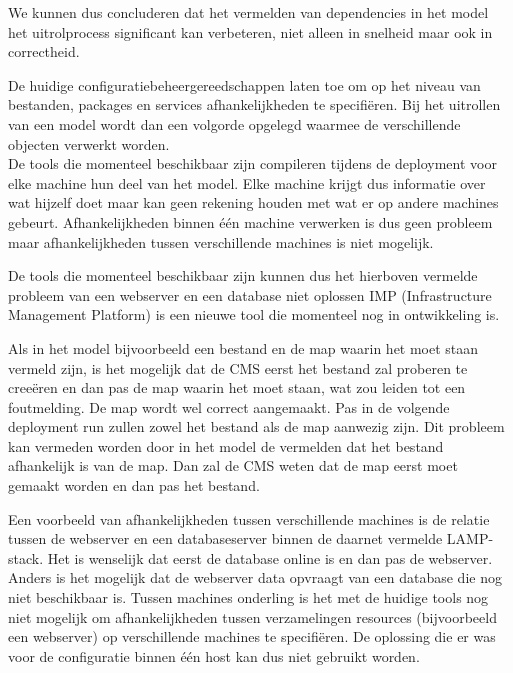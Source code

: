 We kunnen dus concluderen dat het vermelden van dependencies in het model het uitrolprocess significant kan verbeteren, niet alleen in snelheid maar ook in correctheid.

De huidige configuratiebeheergereedschappen laten toe om op het niveau van bestanden, packages en services afhankelijkheden te specifi\"eren.
Bij het uitrollen van een model wordt dan een volgorde opgelegd waarmee de verschillende objecten verwerkt worden.
\\
De tools die momenteel beschikbaar zijn compileren tijdens de deployment voor elke machine hun deel van het model.
Elke machine krijgt dus informatie over wat hijzelf doet maar kan geen rekening houden met wat er op andere machines gebeurt.
Afhankelijkheden binnen \'e\'en machine verwerken is dus geen probleem maar afhankelijkheden tussen verschillende machines is niet mogelijk. 

De tools die momenteel beschikbaar zijn kunnen dus het hierboven vermelde probleem van een webserver en een database niet oplossen
IMP (Infrastructure Management Platform) is een nieuwe tool die momenteel nog in ontwikkeling is.




Als in het model bijvoorbeeld een bestand en de map waarin het moet staan vermeld zijn, is het mogelijk dat de CMS eerst het bestand zal
proberen te cree\"eren en dan pas de map waarin het moet staan, wat zou leiden tot een foutmelding. De map wordt wel correct aangemaakt.
Pas in de volgende deployment run zullen zowel het bestand als de map aanwezig zijn.
Dit probleem kan vermeden worden door in het model de vermelden dat het bestand afhankelijk is van de map.
Dan zal de CMS weten dat de map eerst moet gemaakt worden en dan pas het bestand.


Een voorbeeld van afhankelijkheden tussen verschillende machines is de relatie tussen de webserver en een databaseserver binnen de daarnet
vermelde LAMP-stack.
Het is wenselijk dat eerst de database online is en dan pas de webserver.
Anders is het mogelijk dat de webserver data opvraagt van een database die nog niet beschikbaar is.
Tussen machines onderling is het met de huidige tools nog niet mogelijk om afhankelijkheden tussen verzamelingen resources (bijvoorbeeld een webserver) op verschillende machines te specifi\"eren. 
De oplossing die er was voor de configuratie binnen \'e\'en host kan dus niet gebruikt worden.

